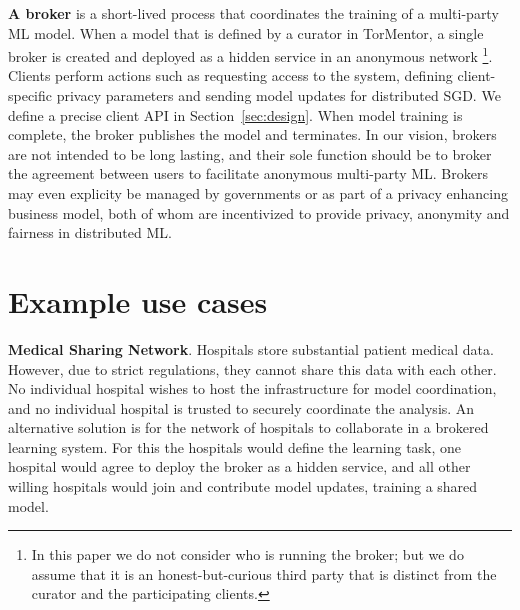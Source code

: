 
\textbf{A broker} is a short-lived process that coordinates the
training of a multi-party ML model. When a model that is defined by a
curator in TorMentor, a single broker is created and deployed as a
hidden service in an anonymous network \footnote{In this paper we do not
  consider who is running the broker; but we do assume that it is
  an honest-but-curious third party that is distinct from the
  curator and the participating clients.}.
%
Clients perform actions such as requesting access to the system, defining
client-specific privacy parameters and sending model updates for
distributed SGD. We define a precise client API in 
Section~\ref{sec:design}. When model training is complete, the broker
publishes the model and terminates. In our vision, brokers are not
intended to be long lasting, and their sole function should be to
broker the agreement between users to facilitate anonymous multi-party
ML. Brokers may even explicity be managed by governments or as part of
a privacy enhancing business model, both of whom are incentivized to
provide privacy, anonymity and fairness in distributed ML.


\section{Example use cases}

\noindent \textbf{Medical Sharing Network}. Hospitals store substantial
patient medical data. However, due to strict regulations, they 
cannot share this data with each other. No individual
hospital wishes to host the infrastructure for model coordination, and
no individual hospital is trusted to securely coordinate the analysis.
An alternative solution is for the network of hospitals to collaborate in
a brokered learning system. For this the hospitals would define the
learning task, one hospital would agree to deploy the broker as a
hidden service, and all other willing hospitals would join and
contribute model updates, training a shared model. \\

